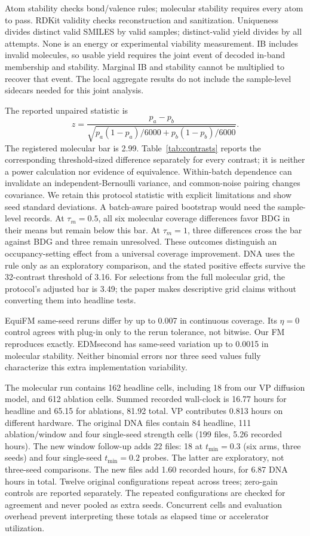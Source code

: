 \documentclass{article}
\begin{document}
Atom stability checks bond/valence rules; molecular stability requires every atom to pass. RDKit validity checks reconstruction and sanitization. Uniqueness divides distinct valid SMILES by valid samples; distinct-valid yield divides by all attempts. None is an energy or experimental viability measurement. IB includes invalid molecules, so usable yield requires the joint event of decoded in-band membership and stability. Marginal IB and stability cannot be multiplied to recover that event. The local aggregate results do not include the sample-level sidecars needed for this joint analysis.

The reported unpaired statistic is
\[
 z=\frac{p_a-p_b}{\sqrt{p_a(1-p_a)/6000+p_b(1-p_b)/6000}}.
\]
The registered molecular bar is 2.99. Table~\ref{tab:contrasts} reports the corresponding threshold-sized difference separately for every contrast; it is neither a power calculation nor evidence of equivalence. Within-batch dependence can invalidate an independent-Bernoulli variance, and common-noise pairing changes covariance. We retain this protocol statistic with explicit limitations and show seed standard deviations. A batch-aware paired bootstrap would need the sample-level records. At $\tau_m=0.5$, all six molecular coverage differences favor BDG in their means but remain below this bar. At $\tau_m=1$, three differences cross the bar against BDG and three remain unresolved. These outcomes distinguish an occupancy-setting effect from a universal coverage improvement. DNA uses the rule only as an exploratory comparison, and the stated positive effects survive the 32-contrast threshold of 3.16. For selections from the full molecular grid, the protocol's adjusted bar is 3.49; the paper makes descriptive grid claims without converting them into headline tests.

EquiFM same-seed reruns differ by up to 0.007 in continuous coverage. Its $\eta=0$ control agrees with plug-in only to the rerun tolerance, not bitwise. Our FM reproduces exactly. EDMsecond has same-seed variation up to 0.0015 in molecular stability. Neither binomial errors nor three seed values fully characterize this extra implementation variability.

The molecular run contains 162 headline cells, including 18 from our VP diffusion model, and 612 ablation cells. Summed recorded wall-clock is 16.77 hours for headline and 65.15 for ablations, 81.92 total. VP contributes 0.813 hours on different hardware. The original DNA files contain 84 headline, 111 ablation/window and four single-seed strength cells (199 files, 5.26 recorded hours). The new window follow-up adds 22 files: 18 at $t_{\min}=0.3$ (six arms, three seeds) and four single-seed $t_{\min}=0.2$ probes. The latter are exploratory, not three-seed comparisons. The new files add 1.60 recorded hours, for 6.87 DNA hours in total. Twelve original configurations repeat across trees; zero-gain controls are reported separately. The repeated configurations are checked for agreement and never pooled as extra seeds. Concurrent cells and evaluation overhead prevent interpreting these totals as elapsed time or accelerator utilization.
\end{document}
